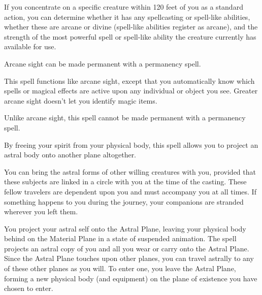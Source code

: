 \begin{multicols}{2}
\begin{small}
\smallskip\noindent If you concentrate on a specific creature within 120 feet of you as a standard action, you can determine whether it has any spellcasting or spell-like abilities, whether these are arcane or divine (spell-like abilities register as arcane), and the strength of the most powerful spell or spell-like ability the creature currently has available for use.

\smallskip\noindent Arcane sight can be made permanent with a permanency spell.

\noindent This spell functions like arcane sight, except that you automatically know which spells or magical effects are active upon any individual or object you see.
Greater arcane sight doesn't let you identify magic items.

\smallskip\noindent Unlike arcane sight, this spell cannot be made permanent with a permanency spell.

\noindent By freeing your spirit from your physical body, this spell allows you to project an astral body onto another plane altogether.

\smallskip\noindent You can bring the astral forms of other willing creatures with you, provided that these subjects are linked in a circle with you at the time of the casting. These fellow travelers are dependent upon you and must accompany you at all times. If something happens to you during the journey, your companions are stranded wherever you left them.

\smallskip\noindent You project your astral self onto the Astral Plane, leaving your physical body behind on the Material Plane in a state of suspended animation. The spell projects an astral copy of you and all you wear or carry onto the Astral Plane. Since the Astral Plane touches upon other planes, you can travel astrally to any of these other planes as you will. To enter one, you leave the Astral Plane, forming a new physical body (and equipment) on the plane of existence you have chosen to enter.


\end{small}
\end{multicols}
